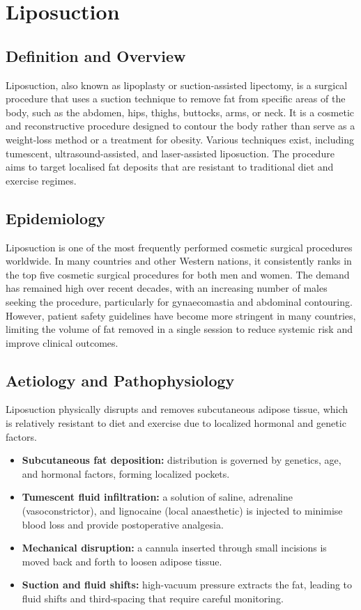 \chapter{Liposuction}

\section*{Definition and Overview}
Liposuction, also known as lipoplasty or suction-assisted lipectomy, is a surgical procedure that uses a suction technique to remove fat from specific areas of the body, such as the abdomen, hips, thighs, buttocks, arms, or neck. It is a cosmetic and reconstructive procedure designed to contour the body rather than serve as a weight-loss method or a treatment for obesity. Various techniques exist, including tumescent, ultrasound-assisted, and laser-assisted liposuction. The procedure aims to target localised fat deposits that are resistant to traditional diet and exercise regimes.

\section*{Epidemiology}
Liposuction is one of the most frequently performed cosmetic surgical procedures worldwide. In many countries and other Western nations, it consistently ranks in the top five cosmetic surgical procedures for both men and women. The demand has remained high over recent decades, with an increasing number of males seeking the procedure, particularly for gynaecomastia and abdominal contouring. However, patient safety guidelines have become more stringent in many countries, limiting the volume of fat removed in a single session to reduce systemic risk and improve clinical outcomes.

\section*{Aetiology and Pathophysiology}
Liposuction physically disrupts and removes subcutaneous adipose tissue, which is relatively resistant to diet and exercise due to localized hormonal and genetic factors.
\begin{itemize}
    \item \textbf{Subcutaneous fat deposition:} distribution is governed by genetics, age, and hormonal factors, forming localized pockets.
    \item \textbf{Tumescent fluid infiltration:} a solution of saline, adrenaline (vasoconstrictor), and lignocaine (local anaesthetic) is injected to minimise blood loss and provide postoperative analgesia.
    \item \textbf{Mechanical disruption:} a cannula inserted through small incisions is moved back and forth to loosen adipose tissue.
    \item \textbf{Suction and fluid shifts:} high-vacuum pressure extracts the fat, leading to fluid shifts and third-spacing that require careful monitoring.
\end{itemize}


